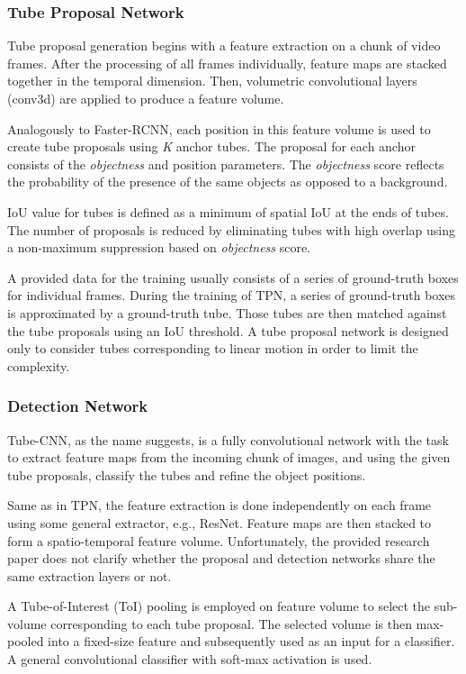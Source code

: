 \subsubsection{Tube Proposal Network}
Tube proposal generation begins with a feature extraction on a chunk of video frames. After the processing of all frames individually, feature maps are stacked together in the temporal dimension. Then, volumetric convolutional layers (conv3d) are applied to produce a feature volume.

Analogously to Faster-RCNN, each position in this feature volume is used to create tube proposals using \textit{K} anchor tubes. The proposal for each anchor consists of the \textit{objectness} and position parameters. The \textit{objectness} score reflects the probability of the presence of the same objects as opposed to a background. 

IoU value for tubes is defined as a minimum of spatial IoU at the ends of tubes. The number of proposals is reduced by eliminating tubes with high overlap using a non-maximum suppression based on \textit{objectness} score. 

A provided data for the training usually consists of a series of ground-truth boxes for individual frames. During the training of TPN, a series of ground-truth boxes is approximated by a ground-truth tube. Those tubes are then matched against the tube proposals using an IoU threshold. A tube proposal network is designed only to consider tubes corresponding to linear motion in order to limit the complexity. 

\subsubsection{Detection Network}
Tube-CNN, as the name suggests, is a fully convolutional network with the task to extract feature maps from the incoming chunk of images, and using the given tube proposals, classify the tubes and refine the object positions. 

Same as in TPN, the feature extraction is done independently on each frame using some general extractor, e.g., ResNet. Feature maps are then stacked to form a spatio-temporal feature volume. Unfortunately, the provided research paper does not clarify whether the proposal and detection networks share the same extraction layers or not.

A Tube-of-Interest (ToI) pooling is employed on feature volume to select the sub-volume corresponding to each tube proposal. The selected volume is then max-pooled into a fixed-size feature and subsequently used as an input for a classifier. A general convolutional classifier with soft-max activation is used. 

